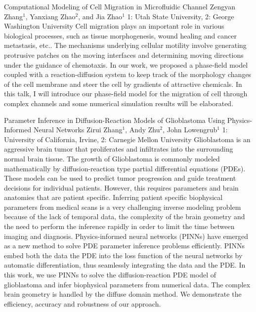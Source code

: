 \vspace{1.5ex}
\abs
{Computational Modeling of Cell Migration in Microfluidic Channel}
{Zengyan Zhang$^{1}$, Yanxiang Zhao$^{2}$, and Jia Zhao$^{1}$}
{1: Utah State University, 2: George Washington University}
{Cell migration plays an important role in various biological processes, such as tissue morphogenesis, wound healing and cancer metastasis, etc.. The mechanisms underlying cellular motility involve generating protrusive patches on the moving interfaces and determining moving directions under the guidance of chemotaxis. In our work, we proposed a phase-field model coupled with a reaction-diffusion system to keep track of the morphology changes of the cell membrane and steer the cell by gradients of attractive chemicals. In this talk, I will introduce our phase-field model for the migration of cell through complex channels and some numerical simulation results will be elaborated.}


\vspace{1.5ex}
\abs
{Parameter Inference in Diffusion-Reaction Models of Glioblastoma Using Physics-Informed Neural Networks}
{Zirui Zhang$^{1}$, Andy Zhu$^{2}$, John Lowengrub$^{1}$}
{1: University of California, Irvine, 2: Carnegie Mellon University}
{Glioblastoma is an aggressive brain tumor that proliferates and infiltrates into the surrounding normal brain tissue. The growth of Glioblastoma is commonly modeled mathematically by diffusion-reaction type partial differential equations (PDEs). These models can be used to predict tumor progression and guide treatment decisions for individual patients. However, this requires parameters and brain anatomies that are patient specific. Inferring patient specific biophysical parameters from medical scans is a very challenging inverse modeling problem because of the lack of temporal data, the complexity of the brain geometry and the need to perform the inference rapidly in order to limit the time between imaging and diagnosis. Physics-informed neural networks (PINNs) have emerged as a new method to solve PDE parameter inference problems efficiently. PINNs embed both the data the PDE into the loss function of the neural networks by automatic differentiation, thus seamlessly integrating the data and the PDE. In this work, we use PINNs to solve the diffusion-reaction PDE model of glioblastoma and infer biophysical parameters from numerical data. The complex brain geometry is handled by the diffuse domain method. We demonstrate the efficiency, accuracy and robustness of our approach.}


